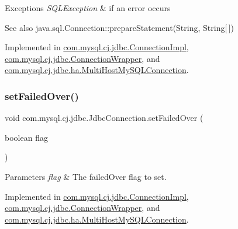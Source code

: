 \begin{DoxyExceptions}{Exceptions}
{\em S\+Q\+L\+Exception} & if an error occurs\\
\hline
\end{DoxyExceptions}
\begin{DoxySeeAlso}{See also}
java.\+sql.\+Connection\+::prepare\+Statement(\+String, String\mbox{[}$\,$\mbox{]}) 
\end{DoxySeeAlso}


Implemented in \mbox{\hyperlink{classcom_1_1mysql_1_1cj_1_1jdbc_1_1_connection_impl_ae7caa7907c0b5245c5f8ac2f209abf2a}{com.\+mysql.\+cj.\+jdbc.\+Connection\+Impl}}, \mbox{\hyperlink{classcom_1_1mysql_1_1cj_1_1jdbc_1_1_connection_wrapper_a02f353527ecf3306019227fa68d014a7}{com.\+mysql.\+cj.\+jdbc.\+Connection\+Wrapper}}, and \mbox{\hyperlink{classcom_1_1mysql_1_1cj_1_1jdbc_1_1ha_1_1_multi_host_my_s_q_l_connection_ae0fc18db059bf9625bc8741334de6eef}{com.\+mysql.\+cj.\+jdbc.\+ha.\+Multi\+Host\+My\+S\+Q\+L\+Connection}}.

\mbox{\label{interfacecom_1_1mysql_1_1cj_1_1jdbc_1_1_jdbc_connection_a65cb0cc5d2afc54002bfc16222bbe402}} 
\subsubsection{\texorpdfstring{set\+Failed\+Over()}{setFailedOver()}}
{\footnotesize\ttfamily void com.\+mysql.\+cj.\+jdbc.\+Jdbc\+Connection.\+set\+Failed\+Over (\begin{DoxyParamCaption}\item[{boolean}]{flag }\end{DoxyParamCaption})}


\begin{DoxyParams}{Parameters}
{\em flag} & The failed\+Over flag to set. \\
\hline
\end{DoxyParams}


Implemented in \mbox{\hyperlink{classcom_1_1mysql_1_1cj_1_1jdbc_1_1_connection_impl_afef2182754848487fb2e37daea9ff7eb}{com.\+mysql.\+cj.\+jdbc.\+Connection\+Impl}}, \mbox{\hyperlink{classcom_1_1mysql_1_1cj_1_1jdbc_1_1_connection_wrapper_aaa41827ca4520529797d55c4f8834f76}{com.\+mysql.\+cj.\+jdbc.\+Connection\+Wrapper}}, and \mbox{\hyperlink{classcom_1_1mysql_1_1cj_1_1jdbc_1_1ha_1_1_multi_host_my_s_q_l_connection_aa86a711c0807cc5b31b9e3600477184b}{com.\+mysql.\+cj.\+jdbc.\+ha.\+Multi\+Host\+My\+S\+Q\+L\+Connection}}.

